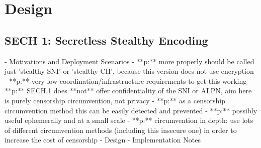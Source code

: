 \chapter{Design}
\label{chap:Design}

\section{SECH 1: Secretless Stealthy Encoding}
  - Motivations and Deployment Scenarios
    - **p:** more properly should be called just 'stealthy SNI' or 'stealthy CH', because this version does not use encryption
    - **p:** very low coordination/infrastructure requirements to get this working
    - **p:** SECH.1 does **not** offer confidentiality of the SNI or ALPN, aim here is purely censorship circumvention, not privacy
    - **p:** as a censorship circumvention method this can be easily detected and prevented
    - **p:** possibly useful ephemerally and at a small scale
    - **p:** circumvention in depth: use lots of different circumvention methods (including this insecure one) in order to increase the cost of censorship
  - Design
  - Implementation Notes
